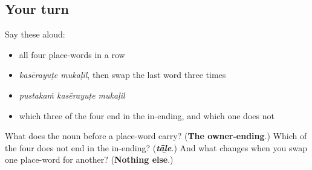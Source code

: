 \subsection*{Your turn}
Say these aloud:

\begin{itemize}
\raggedright
  \item all four place-words in a row
  \item \emph{kasērayuṭe mukaḷil}, then swap the last word three times
  \item \emph{pustakaṁ kasērayuṭe mukaḷil}
  \item which three of the four end in the in-ending, and which one does not
\end{itemize}

\begin{tcolorbox}[breakable,colback=teal!4,colframe=teal!35!black,title={Before you move on}]
What does the noun before a place-word carry? (\textbf{The owner-ending}.) Which of the four does not end in the in-ending? (\emph{\textbf{tāḻe}}.) And what changes when you swap one place-word for another? (\textbf{Nothing else}.)
\end{tcolorbox}

